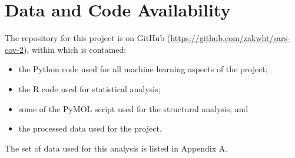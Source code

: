 \newpage
\section*{Data and Code Availability}

The repository for this project is on GitHub (\url{https://github.com/zakwht/sars-cov-2}), within which is contained:

\begin{itemize}
    \setlength\itemsep{0em}
    \item the Python code used for all machine learning aspects of the project;
    \item the R code used for statistical analysis;
    \item some of the PyMOL script used for the structural analysis; and
    \item the processed data used for the project.
\end{itemize}

\noindent
The set of data used for this analysis is listed in Appendix A.

\newpage
\printbibliography
{}
